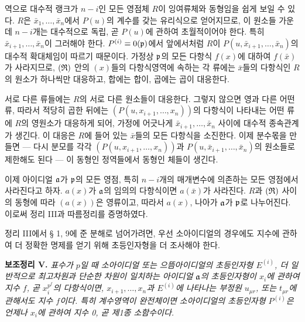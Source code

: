 역으로 대수적 랭크가 \(n-i\)인 모든 영점체 \(R\)이 잉여류체와 동형임을 쉽게 보일 수 있다. \(R\)은 \(\bar{x}_1,\ldots,\bar{x}_n\)에서 \(P(u)\)의 계수를 갖는 유리식으로 얻어지므로, 이 원소들 가운데 \(n-i\)개는 대수적으로 독립, 곧 \(P(u)\)에 관하여 초월적이어야 한다. 특히 \(\bar{x}_{i+1},\ldots,\bar{x}_n\)이 그러해야 한다. \(P^{(i)}\equiv0(\mathfrak p)\)에서 앞에서처럼 \(R\)이 \(P(u,\bar{x}_{i+1},\ldots,\bar{x}_n)\)의 대수적 확대체임이 따르기 때문이다. 가정상 \(\mathfrak p\)의 모든 다항식 \(f(x)\)에 대하여 \(f(\bar{x})\)가 사라지므로, \((\mathfrak{R})\) 안의 \((x)\)들의 다항식영역에 속하는 각 류에는 \(\bar{x}\)들의 다항식인 \(R\)의 원소가 하나씩만 대응하고, 합에는 합이, 곱에는 곱이 대응한다.

서로 다른 류들에는 \(R\)의 서로 다른 원소들이 대응한다. 그렇지 않으면 영과 다른 어떤 류, 따라서 적당히 곱한 뒤에는 \((P(u,x_{i+1},\ldots,x_n))\)의 다항식이 나타내는 어떤 류에 \(R\)의 영원소가 대응하게 되어, 가정에 어긋나게 \(\bar{x}_{i+1},\ldots,\bar{x}_n\) 사이에 대수적 종속관계가 생긴다. 이 대응은 \(R\)에 들어 있는 \(\bar{x}\)들의 모든 다항식을 소진한다. 이제 분수몫을 만들면 --- 다시 분모를 각각 \((P(u,x_{i+1},\ldots,x_n))\)과 \(P(u,\bar{x}_{i+1},\ldots,\bar{x}_n)\)의 원소들로 제한해도 된다 --- 이 동형인 정역들에서 동형인 체들이 생긴다.

이제 아이디얼 \(\mathfrak a\)가 \(\mathfrak p\)의 모든 영점, 특히 \(n-i\)개의 매개변수에 의존하는 모든 영점에서 사라진다고 하자. \(a(x)\)가 \(\mathfrak a\)의 임의의 다항식이면 \(a(\bar{x})\)가 사라진다. \(R\)과 \((\mathfrak{R})\) 사이의 동형에 따라 \((a(x))\)은 영류이고, 따라서 \(a(x)\), 나아가 \(\mathfrak a\)가 \(\mathfrak p\)로 나누어진다. 이로써 정리 III과 따름정리를 증명하였다.

정리 III에서 § 1, 9에 준 분해로 넘어가려면, 우선 소아이디얼의 경우에도 지수에 관하여 더 정확한 명제를 얻기 위해 초등인자형을 더 조사해야 한다.

\textbf{보조정리 V.} \emph{표수가 \(p\)일 때 소아이디얼 또는 으뜸아이디얼의 초등인자형 \(E^{(i)}\), 더 일반적으로 최고차원과 단순한 차원이 일치하는 아이디얼 \(\mathfrak a\)의 초등인자형이 \(x_i\)에 관하여 지수 \(f\), 곧 \(x_i^{p^f}\)의 다항식이면, \(x_{i+1},\ldots,x_n\)과 \(E^{(i)}\)에 나타나는 부정원 \(u_{\mu r}\), 또는 \(t_{\mu r}\)에 관해서도 지수 \(f\)이다. 특히 계수영역이 완전체이면 소아이디얼의 초등인자형 \(P^{(i)}\)은 언제나 \(x_i\)에 관하여 지수 0, 곧 제1종 소함수이다.}

